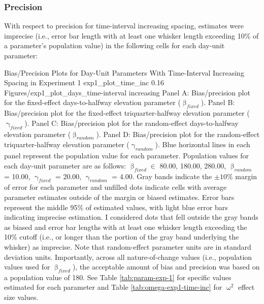 \documentclass[
12pt, %
twoside,
english]{guelphthesis}
\begin{document}
\hypertarget{precision-time-inc-exp1}{%
\subsubsection{Precision}\label{precision-time-inc-exp1}}

With respect to precision for time-interval increasing spacing, estimates were imprecise (i.e., error bar length with at least one whisker length exceeding 10\% of a parameter's population value) in the following cells for each day-unit parameter:
\begin{apaFigure}
[portrait] %
[samepage] 
[-0.2cm] %
{Bias/Precision Plots for Day-Unit Parameters With Time-Interval Increasing Spacing in Experiment 1} %
{exp1_plot_time_inc} %
{0.16} %
{Figures/exp1_plot_days_time-interval increasing} %
{Panel A: Bias/precision plot for the fixed-effect days-to-halfway elevation parameter ($\upbeta_{fixed}$). Panel B: Bias/precision plot for the fixed-effect triquarter-halfway elevation parameter ($\upgamma_{fixed}$). Panel C: Bias/precision plot for the random-effect days-to-halfway elevation parameter ($\upbeta_{random}$). Panel D: Bias/precision plot for the random-effect triquarter-halfway elevation parameter ($\upgamma_{random}$). Blue horizontal lines in each panel represent the population value for each parameter. Population values for each day-unit parameter are as follows: $\upbeta_{fixed} \in$ {80.00, 180.00, 280.00}, $\upbeta_{random}$ = 10.00, $\upgamma_{fixed}$ = 20.00, $\upgamma_{random}$ = 4.00. Gray bands indicate the $\pm 10\%$ margin of error for each parameter and unfilled dots indicate cells with average parameter estimates outside of the margin or biased estimates. Error bars represent the middle 95\% of estimated values, with light blue error bars indicating imprecise estimation. I considered dots that fell outside the gray bands as biased and error bar lengths with at least one whisker length exceeding the 10\% cutoff (i.e., or longer than the portion of the gray band underlying the whisker) as imprecise. Note that random-effect parameter units are in standard deviation units. Importantly, across all nature-of-change values (i.e., population values used for $\upbeta_{fixed}$), the acceptable amount of bias and precision was based on a population value of 180. See Table \ref{tab:param-exp-1} for specific values estimated for each parameter and Table \ref{tab:omega-exp1-time-inc} for $\upomega^2$ effect size values.}
\end{apaFigure}
\end{document}
